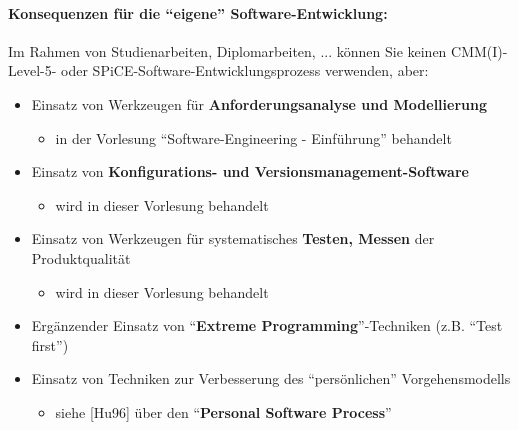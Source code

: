 \paragraph{Konsequenzen für die ``eigene'' Software-Entwicklung:}
Im Rahmen von Studienarbeiten, Diplomarbeiten, ... können Sie keinen CMM(I)-Level-5- oder SPiCE-Software-Entwicklungsprozess verwenden, aber:
\begin{itemize}
	\item Einsatz von Werkzeugen für \textbf{Anforderungsanalyse und Modellierung}
	\begin{itemize}
		\item in der Vorlesung ``Software-Engineering - Einführung'' behandelt
	\end{itemize}
	\item Einsatz von \textbf{Konfigurations- und Versionsmanagement-Software}
	\begin{itemize}
		\item wird in dieser Vorlesung behandelt
	\end{itemize}
	\item Einsatz von Werkzeugen für systematisches \textbf{Testen, Messen} der Produktqualität
	\begin{itemize}
		\item wird in dieser Vorlesung behandelt
	\end{itemize}
	\item Ergänzender Einsatz von ``\textbf{Extreme Programming}''-Techniken (z.B. ``Test first'')
	\item Einsatz von Techniken zur Verbesserung des ``persönlichen'' Vorgehensmodells
	\begin{itemize}
		\item siehe [Hu96] über den ``\textbf{Personal Software Process}''
	\end{itemize}
\end{itemize}

